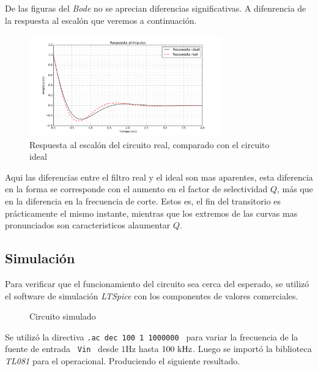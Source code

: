 De las figuras del \textit{Bode} no se aprecian diferencias significativas. A difenrencia de la respuesta al escal\'on que veremos a continuaci\'on.

\begin{figure}[hbt]
	\centering
	\includegraphics[width=8.3cm]{imagenes/StepReal}
	\caption{Respuesta al escal\'on del circuito real, comparado con el circuito ideal}	
\end{figure}
Aqui las diferencias entre el filtro real y el ideal son mas aparentes, esta diferencia en la forma se corresponde con el aumento en el factor de selectividad $Q$, m\'as que en la diferencia en la frecuencia de corte. Estos es, el fin del transitorio es pr\'acticamente el mismo instante, mientras que los extremos de las curvas mas pronunciados son caracteristicos alaumentar $Q$.
 


\subsection*{Simulaci\'on}
	Para verificar que el funcionamiento del circuito sea cerca del esperado, se utiliz\'o el software de simulaci\'on \textit{LTSpice} con los componentes de valores comerciales. 
\begin{figure}[hbt]
	\centering
	\caption{Circuito simulado}
\end{figure}

	
Se utiliz\'o la directiva \texttt{.ac dec 100 1 1000000 } para
variar la  frecuencia de la fuente de entrada \texttt{ Vin } desde  $1 \si{\hertz}$ hasta $100 \ \si{\kilo\hertz}$. Luego se import\'o la biblioteca \textit{TL081} para el operacional. Produciendo el siguiente resultado.


